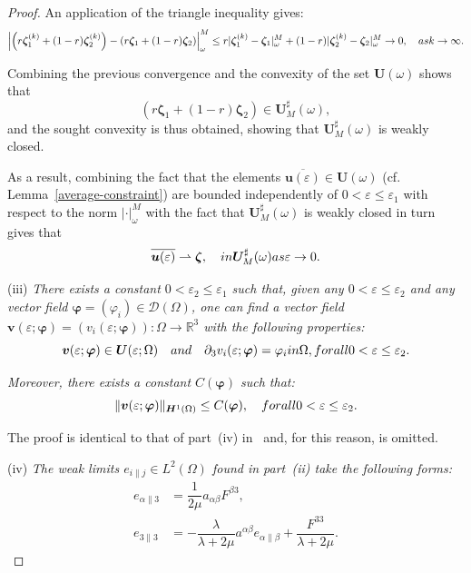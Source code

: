 \documentclass{amsart}
\begin{document}
\begin{proof}
An application of the triangle inequality gives:
\begin{equation*}
	\left|\left(r \bm{\zeta}_1^{(k)}+(1-r)\bm{\zeta}_2^{(k)}\right) - \left(r \bm{\zeta}_1+(1-r)\bm{\zeta}_2\right)\right|_\omega^M \le r |\bm{\zeta}_1^{(k)}-\bm{\zeta}_1|_\omega^M+(1-r) |\bm{\zeta}_2^{(k)}-\bm{\zeta}_2|_\omega^M \to 0, \quad\textup{ as }k\to\infty.
\end{equation*}

Combining the previous convergence and the convexity of the set $\bm{U}(\omega)$ shows that
\begin{equation*}
	\left(r \bm{\zeta}_1+(1-r)\bm{\zeta}_2\right) \in \bm{U}_M^\sharp(\omega),
\end{equation*}
and the sought convexity is thus obtained, showing that $\bm{U}_M^\sharp(\omega)$ is weakly closed.

As a result, combining the fact that the elements $\overline{\bm{u}(\varepsilon)} \in \bm{U}(\omega)$ (cf. Lemma~\ref{average-constraint}) are bounded independently of $0<\varepsilon\le \varepsilon_1$ with respect to the norm $|\cdot|_\omega^M$ with the fact that $\bm{U}_M^\sharp(\omega)$ is weakly closed in turn gives that
\begin{equation*}
	\overline{\bm{u}(\varepsilon)} \rightharpoonup \bm{\zeta},\quad \textup{ in }\bm{U}_M^\sharp(\omega)\textup{ as }\varepsilon\to 0.
\end{equation*}

(iii) \emph{There exists a constant $0<\varepsilon_2\le \varepsilon_1$ such that, given any $0 < \varepsilon \le \varepsilon_2$ and any vector field $\bm{\varphi}=(\varphi_i)\in\boldsymbol{\mathcal{D}}(\Omega)$, one can find a vector field $\bm{v}(\varepsilon;\bm{\varphi})= (v_i(\varepsilon;\bm{\varphi})):\Omega\to\mathbb{R}^3$ with the following properties:}
$$
\bm{v}(\varepsilon;\bm{\varphi}) \in \bm{U}(\varepsilon;\Omega) \quad \textup{ and } \quad \partial_3 v_i (\varepsilon;\bm{\varphi}) = \varphi_i \textup{ in } \Omega, \textup{ for all } 0 <\varepsilon\le\varepsilon_2.
$$

\emph{Moreover, there exists a constant $C(\bm{\varphi})$ such that:}
$$
\|\bm{v} (\varepsilon; \bm{\varphi})\|_{\bm{H}^1(\Omega)} \le C(\bm{\varphi}),\quad \textup{ for all } 0 < \varepsilon \le \varepsilon_2.
$$

The proof is identical to that of part~(iv) in~\cite{CiaMarPie2018} and, for this reason, is omitted.

(iv) \emph{The weak limits $e_{i\|j} \in L^2(\Omega)$ found in part~(ii) take the following forms:}
\begin{equation*}
	\begin{aligned}
		e_{\alpha\|3}&=\dfrac{1}{2\mu} a_{\alpha\beta} F^{\beta3},\\
		e_{3\|3}&=-\dfrac{\lambda}{\lambda+2\mu}a^{\alpha\beta}e_{\alpha\|\beta}+\dfrac{F^{33}}{\lambda+2\mu}.
	\end{aligned}
\end{equation*}


\end{proof}
\end{document}
